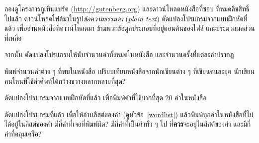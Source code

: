 \begin{exercise}


ลองดูโครงการกูเทินแบร์ค (\url{http://gutenberg.org})
และดาวน์โหลดหนังสือที่ชอบ ที่หมดลิขสิทธิ์ไปแล้ว
ดาวน์โหลดไฟล์มาในรูป\textit{ข้อความธรรมดา} (\textit{plain text})
%
%
ดัดแปลงโปรแกรมจากแบบฝึกหัดที่แล้ว เพื่ออ่านหนังสือที่ดาวน์โหลดมา
ข้ามพวกข้อมูลประกอบที่อยู่ตอนต้นของไฟล์
และประมวลผลส่วนที่เหลือ
%

จากนั้น ดัดแปลงโปรแกรมให้นับจำนวนคำทั้งหมดในหนังสือ
และจำนวนครั้งที่แต่ละคำปรากฏ
%

พิมพ์จำนวนคำต่าง ๆ ที่พบในหนังสือ
เปรียบเทียบหนังสือจากนักเขียนต่าง ๆ ที่เขียนคนละยุค
นักเขียนคนไหนที่ใช้คำศัพท์ได้กว้างขวางหลากหลายที่สุด?
\\
\end{exercise}


\begin{exercise}

%
ดัดแปลงโปรแกรมจากแบบฝึกหัดที่แล้ว
เพื่อพิมพ์คำที่ใช้มากที่สุด 20 คำในหนังสือ
\\
\end{exercise}


\begin{exercise}

%
ดัดแปลงโปรแกรมที่แล้ว เพื่อให้อ่านลิสต์ของคำ (ดูหัวข้อ~\ref{wordlist})
แล้วพิมพ์ทุกคำในหนังสือที่ไม่ได้อยู่ในลิสต์ของคำ
มีกี่คำที่เจอที่พิมพ์ผิด?
มีกี่คำที่เป็นคำทั่ว ๆ ไป ที่\textbf{ควร}จะอยู่ในลิสต์ของคำ 
และมีกี่คำที่คลุมเครือ?
\\
\end{exercise}


